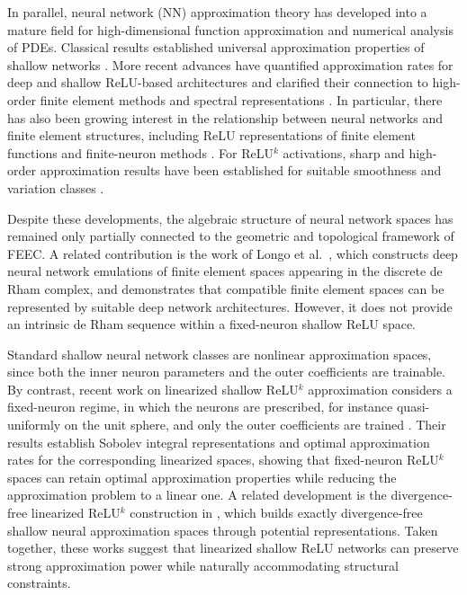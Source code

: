 \documentclass[pdflatex,sn-mathphys-num]{sn-jnl}
\numberwithin{equation}{section}
\numberwithin{theorem}{section}
\numberwithin{table}{section}
\numberwithin{figure}{section}
\begin{document}
In parallel, neural network (NN) approximation theory has developed into a mature field for high-dimensional function approximation and numerical analysis of PDEs.  Classical results established universal approximation properties of shallow networks \cite{cybenko1989approximation,hornik1989multilayer}.  More recent advances have quantified approximation rates for deep and shallow ReLU-based architectures and clarified their connection to high-order finite element methods and spectral representations \cite{schwab2019deep,opschoor2020deep,schwab2023deep}.  In particular, there has also been growing interest in the relationship between neural networks and finite element structures, including ReLU representations of finite element
functions and finite-neuron methods \cite{he2020relu,xu2020finite}. For
ReLU$^k$ activations, sharp and high-order approximation results have been
established for suitable smoothness and variation classes
\cite{siegel2022highorder,siegel2024sharp}.

Despite these developments, the algebraic structure of neural network spaces has remained only partially connected to the geometric and topological framework of FEEC.  A related contribution is the work of Longo et al.~\cite{longo2023rham}, which constructs deep neural network emulations of finite element spaces appearing in the discrete de Rham complex, and demonstrates that compatible finite element spaces can be represented by suitable deep network architectures.  However, it does not provide an intrinsic de Rham sequence within a fixed-neuron shallow ReLU space. 

Standard shallow neural network classes are nonlinear approximation spaces,
since both the inner neuron parameters and the outer coefficients are
trainable. By contrast, recent work on linearized shallow ReLU$^k$
approximation considers a fixed-neuron regime, in which the neurons are
prescribed, for instance quasi-uniformly on the unit sphere, and only the
outer coefficients are trained \cite{liu2025integral}. Their results establish Sobolev integral representations and optimal approximation rates for the corresponding linearized spaces, showing that fixed-neuron ReLU$^k$ spaces can retain optimal approximation properties while reducing the approximation problem to a linear one. A related development is the divergence-free linearized ReLU$^k$ construction in \cite{he2026divergence}, which builds exactly divergence-free shallow neural approximation spaces through potential representations. Taken together, these works suggest that linearized shallow ReLU networks can preserve strong approximation power while naturally accommodating structural constraints.
\end{document}
